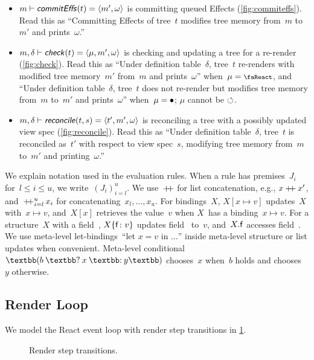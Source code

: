 \begin{itemize}
  \item $m \vdash \textsf{\textit{commitEffs}}(t) = \langle m', \omega\rangle$ is committing queued Effects (\cref{fig:commiteffs}).
    Read this as ``Committing Effects of tree~$t$ modifies tree memory from~$m$ to~$m'$ and prints~$\omega$.''

  \item $m, \delta \vdash \textsf{\textit{check}}(t) = \langle\mu, m', \omega\rangle$ is checking and updating a tree for a re-render (\cref{fig:check}).
    Read this as ``Under definition table~$\delta$, tree~$t$ re-renders with modified tree memory~$m'$ from~$m$ and prints~$\omega$'' when~$\mu = \rendermode$, and ``Under definition table~$\delta$, tree~$t$ does not re-render but modifies tree memory from~$m$ to~$m'$ and prints~$\omega$'' when~$\mu = \bullet$; $\mu$ cannot be $\circlearrowleft$.

  \item $m, \delta \vdash \textsf{\textit{reconcile}}(t, s) = \langle t', m', \omega\rangle$ is reconciling a tree with a possibly updated view spec (\cref{fig:reconcile}).
    Read this as ``Under definition table~$\delta$, tree~$t$ is reconciled as~$t'$ with respect to view spec~$s$, modifying tree memory from~$m$ to~$m'$ and printing~$\omega$.''
\end{itemize}

\begin{nota}
We explain notation used in the evaluation rules.
When a rule has premises~$J_i$ for~$l \le i \le u$, we write~$(J_i)_{i = l}^u$.
We use~$\mathbin{+\negthickspace+}$ for list concatenation, e.g., $x \mathbin{+\negthickspace+} x'$, and~$\operatorname*{+\negthickspace+}_{i=l}^u x_i$ for concatenating~$x_l, \dotsc, x_u$.
For bindings~$X$, $X[x \mapsto v]$ updates~$X$ with~$x \mapsto v$, and~$X[x]$ retrieves the value~$v$ when $X$~has a binding~$x \mapsto v$.
For a structure~$X$ with a field~, $X\{\textup{\textsf{f}}\colon v\}$ updates field~ to~$v$, and~$X.\textup{\textsf{f}}$ accesses field~.
We use meta-level let-bindings~``let $x = v$ in $\dotsc$'' inside meta-level structure or list updates when convenient.
Meta-level conditional~$\scond{b}{x}{y}$ chooses~$x$ when~$b$ holds and chooses~$y$ otherwise.
\end{nota}


\subsection{Render Loop}\label{subsec:lifecycle}
We model the React event loop with render step transitions in \cref{fig:step}.
\begin{figure}[t]
  \centering
  
  \caption{Render step transitions.}\label{fig:step}
\end{figure}

